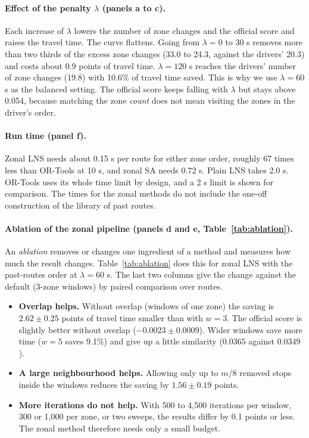 \documentclass[11pt,a4paper]{article}
\begin{document}
\paragraph{Effect of the penalty $\lambda$ (panels a to c).}\label{sec:lambda}
Each increase of $\lambda$ lowers the number of zone changes and the official score and raises the travel time. The curve flattens. Going from $\lambda=0$ to 30 s removes more than two thirds of the excess zone changes (33.0 to 24.3, against the drivers' 20.3) and costs about 0.9 points of travel time. $\lambda=120$ s reaches the drivers' number of zone changes (19.8) with 10.6\% of travel time saved. This is why we use $\lambda=60$ s as the balanced setting. The official score keeps falling with $\lambda$ but stays above 0.054, because matching the zone \emph{count} does not mean visiting the zones in the driver's order.

\paragraph{Run time (panel f).}\label{sec:time}
Zonal LNS needs about 0.15 s per route for either zone order, roughly 67 times less than OR-Tools at 10 s, and zonal SA needs 0.72 s. Plain LNS takes 2.0 s. OR-Tools uses its whole time limit by design, and a 2 s limit is shown for comparison. The times for the zonal methods do not include the one-off construction of the library of past routes.

\paragraph{Ablation of the zonal pipeline (panels d and e, Table~\ref{tab:ablation}).}\label{sec:ablation}
An \emph{ablation} removes or changes one ingredient of a method and measures how much the result changes. Table~\ref{tab:ablation} does this for zonal LNS with the past-routes order at $\lambda=60$ s. The last two columns give the change against the default (3-zone windows) by paired comparison over routes.
\begin{itemize}
\item \textbf{Overlap helps.} Without overlap (windows of one zone) the saving is $2.62\pm0.25$ points of travel time smaller than with $w=3$. The official score is slightly better without overlap ($-0.0023\pm0.0009$). Wider windows save more time ($w=5$ saves 9.1\%) and give up a little similarity ($0.0365$ against $0.0349$).
\item \textbf{A large neighbourhood helps.} Allowing only up to $m/8$ removed stops inside the windows reduces the saving by $1.56\pm0.19$ points.
\item \textbf{More iterations do not help.} With 500 to 4,500 iterations per window, 300 or 1,000 per zone, or two sweeps, the results differ by 0.1 points or less. The zonal method therefore needs only a small budget.
\end{itemize}
\end{document}
